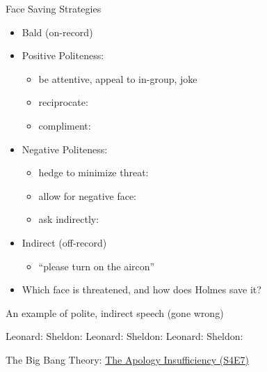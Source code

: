 \documentclass{beamer}
\begin{document}
\begin{frame}{Face Saving Strategies} 
  \begin{itemize}
\item Bald (on-record)
\item Positive Politeness: 
  \begin{itemize}
  \item be attentive, appeal to in-group, joke 
  \item reciprocate: 
  \item compliment: 
  \end{itemize}
\item Negative Politeness: 
  \begin{itemize}
  \item hedge to minimize threat: 
  \item allow for negative face: 
  \item ask indirectly: 
  \end{itemize}
\item Indirect (off-record)
  \begin{itemize}
  \item {} ``please turn on the aircon''
  \end{itemize}
\item[?] Which face is threatened, and how does Holmes save it?
   \hfill {}\task
\end{itemize}



\end{frame}

\begin{frame}{An example of polite, indirect speech (gone wrong)}

\begin{exe}
  \ex Leonard: 
  \ex Sheldon: 
  \ex Leonard: 
  \ex Sheldon: 
  \ex Leonard: 
  \ex Sheldon: 
\end{exe}

The Big Bang Theory: \href{https://www.youtube.com/watch?v=fhv1dOae9MUAn}{The Apology Insufficiency (S4E7)}
\end{frame}
\end{document}
